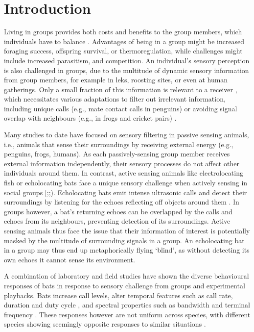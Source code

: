 \documentclass[
]{book}
\begin{document}
\newpage

\hypertarget{introduction-1}{%
\section{Introduction}\label{introduction-1}}

Living in groups provides both costs and benefits to the group members, which individuals have to balance \citep{pulliam1984living}. Advantages of being in a group might be increased foraging success, offspring survival, or thermoregulation, while challenges might include increased parasitism, and competition. An individual's sensory perception is also challenged in groups, due to the multitude of dynamic sensory information from group members, for example in leks, roosting sites, or even at human gatherings. Only a small fraction of this information is relevant to a receiver \citep{socialintegr}, which necessitates various adaptations to filter out irrelevant information, including unique calls (e.g., mate contact calls in penguins) or avoiding signal overlap with neighbours (e.g., in frogs and cricket pairs) \citep{socialintegr}.

Many studies to date have focused on sensory filtering in passive sensing animals, i.e., animals that sense their surroundings by receiving external energy (e.g., penguins, frogs, humans)\citep{zweifel2020defining, nelson2006a}. As each passively-sensing group member receives external information independently, their sensory processes do not affect other individuals around them. In contrast, active sensing animals like electrolocating fish or echolocating bats face a unique sensory challenge when actively sensing in social groups {[}\citet{ulanovsky2008bat};\citet{gillambrasiliensis};\citet{watanabe1963change}). Echolocating bats emit intense ultrasonic calls and detect their surroundings by listening for the echoes reflecting off objects around them \citep{griffin1958listening}. In groups however, a bat's returning echoes can be overlapped by the calls and echoes from its neighbours, preventing detection of its surroundings\citep{ulanovsky2008bat}. Active sensing animals thus face the issue that their information of interest is potentially masked by the multitude of surrounding signals in a group. An echolocating bat in a group may thus end up metaphorically flying `blind', as without detecting its own echoes it cannot sense its environment.

A combination of laboratory and field studies have shown the diverse behavioural responses of bats in response to sensory challenge from groups and experimental playbacks. Bats increase call levels, alter temporal features such as call rate, duration and duty cycle \citep{amichai2015calling, jarvis2013groups, lu2020echolocating, hage2013ambient, lin2016a, gomes2020individual}, and spectral properties such as bandwidth and terminal frequency \citep{hase2018bats, cvikel2015b, gotze2016no, fawcett2015echolocation}. These responses however are not uniform across species, with different species showing seemingly opposite responses to similar situations \citep{ulanovsky2004dynamics, amichai2015calling, jarvis2013groups, adams2017suppression}.
\end{document}
